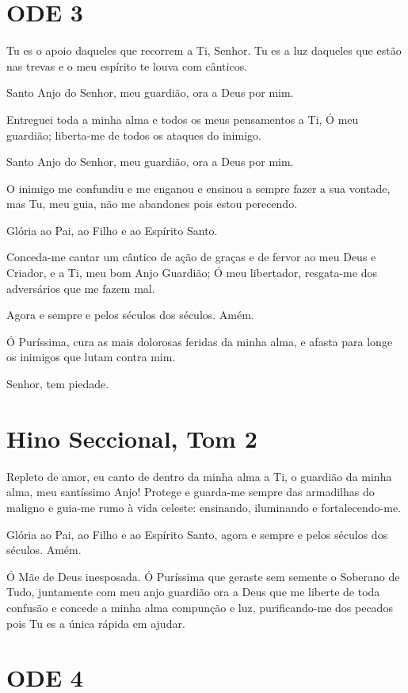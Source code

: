 \documentclass{subfiles}
\begin{document}
\section*{ODE 3}

\eirmos{}Tu es o apoio daqueles que recorrem a Ti, Senhor. Tu es a luz daqueles
que estão nas trevas e o meu espírito te louva com cânticos.

Santo Anjo do Senhor, meu guardião, ora a Deus por mim.

Entreguei toda a minha alma e todos os meus pensamentos a Ti, Ó
meu guardião; liberta-me de todos os ataques do inimigo.

Santo Anjo do Senhor, meu guardião, ora a Deus por mim.

O inimigo me confundiu e me enganou e ensinou a sempre fazer a sua
vontade, mas Tu, meu guia, não me abandones pois estou perecendo.

Glória ao Pai, ao Filho e ao Espírito Santo.

Conceda-me cantar um cântico de ação de graças e de fervor ao meu
Deus e Criador, e a Ti, meu bom Anjo Guardião; Ó meu libertador, resgata-me
dos adversários que me fazem mal.

Agora e sempre e pelos séculos dos séculos. Amém.

Ó Puríssima, cura as mais dolorosas feridas da minha alma, e afasta
para longe os inimigos que lutam contra mim.

Senhor, tem piedade. 

\section*{Hino Seccional, Tom 2}

Repleto de amor, eu canto de dentro da minha alma a Ti, o guardião da minha
alma, meu santíssimo Anjo! Protege e guarda-me sempre das armadilhas do maligno
e guia-me rumo à vida celeste: ensinando, iluminando e fortalecendo-me.

Glória ao Pai, ao Filho e ao Espírito Santo, agora e sempre e pelos séculos dos
séculos. Amém.

\theotokion{}Ó Mãe de Deus inesposada. Ó Puríssima que geraste sem
semente o Soberano de Tudo, juntamente com meu anjo guardião ora a Deus
que me liberte de toda confusão e concede a minha alma compunção e luz,
purificando-me dos pecados pois Tu es a única rápida em ajudar.

\section*{ODE 4}
\end{document}
